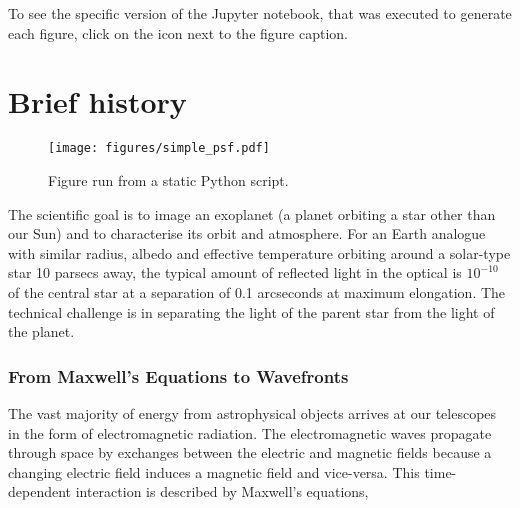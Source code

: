 \documentclass[letterpaper]{ar-1col}
\newcommand{\project}[1]{\textsf{#1}}
\begin{document}
To see the specific version of the \project{Jupyter} notebook, that was executed to generate each figure, click on the icon next to the figure caption.

\section{Brief history}


\begin{figure}[ht]
  \centering
  \texttt{[image: figures/simple\_psf.pdf]}
  \caption{Figure run from a static Python script.}
  \label{fig:simplepsf}
\end{figure}

The scientific goal is to image an exoplanet (a planet orbiting a star other than our Sun) and to characterise its orbit and atmosphere.
%
For an Earth analogue with similar radius, albedo and effective temperature orbiting around a solar-type star 10 parsecs away, the typical amount of reflected light in the optical is $10^{-10}$ of the central star at a separation of 0.1 arcseconds at maximum elongation.
%
The technical challenge is in separating the  light of the parent star from the light of the planet.

\subsubsection{From Maxwell's Equations to Wavefronts}
The vast majority of energy from astrophysical objects arrives at our telescopes in the form of electromagnetic radiation. The electromagnetic waves propagate through space by exchanges between the electric and magnetic fields because a changing electric field induces a magnetic field and vice-versa. This time-dependent interaction is described by Maxwell's equations,
\end{document}
